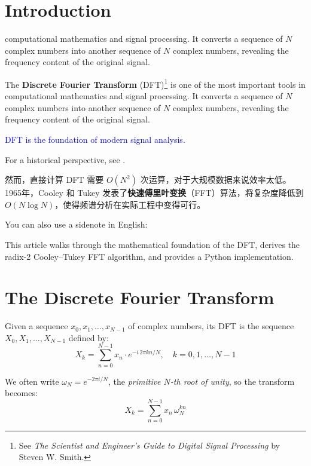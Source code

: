 \documentclass[12pt]{article}
\begin{document}
\makeblogtitle

\section{Introduction}

computational mathematics and signal processing. It converts a sequence of $N$ complex
numbers into another sequence of $N$ complex numbers, revealing the frequency content of
the original signal.

The \textbf{Discrete Fourier Transform} (DFT)\footnote{See \textit{The Scientist and Engineer's Guide to Digital Signal Processing} by Steven W. Smith.} is one of the most important tools in computational mathematics and signal processing. It converts a sequence of $N$ complex numbers into another sequence of $N$ complex numbers, revealing the frequency content of the original signal.

\textcolor{blue}{DFT is the foundation of modern signal analysis.}

For a historical perspective, see \cite{cooley1965fft}.


然而，直接计算 DFT 需要 $O(N^2)$ 次运算，对于大规模数据来说效率太低。
1965年，Cooley 和 Tukey 发表了\textbf{快速傅里叶变换}（FFT）算法，将复杂度降低到 $O(N \log N)$，使得频谱分析在实际工程中变得可行。

You can also use a sidenote in English: 

This article walks through the mathematical foundation of the DFT, derives the radix-2
Cooley--Tukey FFT algorithm, and provides a Python implementation.

\section{The Discrete Fourier Transform}\label{sec:dft}

\begin{definition}
Given a sequence $x_0, x_1, \ldots, x_{N-1}$ of complex numbers, its DFT is the sequence
$X_0, X_1, \ldots, X_{N-1}$ defined by:
\[
  X_k = \sum_{n=0}^{N-1} x_n \cdot e^{-i \, 2\pi k n / N}, \quad k = 0, 1, \ldots, N-1
\]
\end{definition}

We often write $\omega_N = e^{-2\pi i / N}$, the \emph{primitive $N$-th root of unity},
so the transform becomes:
\[
  X_k = \sum_{n=0}^{N-1} x_n \, \omega_N^{kn}
\]
\end{document}
